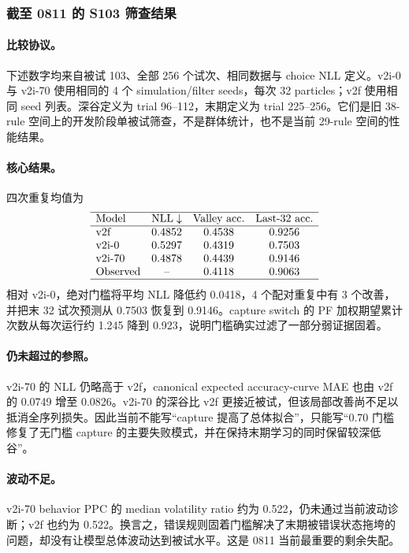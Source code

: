 \subsubsection{截至 0811 的 S103 筛查结果}

\paragraph{比较协议。}
下述数字均来自被试 103、全部 256 个试次、相同数据与 choice NLL 定义。v2i-0 与 v2i-70 使用相同的 4 个 simulation/filter seeds，每次 32 particles；v2f 使用相同 seed 列表。深谷定义为 trial 96--112，末期定义为 trial 225--256。它们是旧 38-rule 空间上的开发阶段单被试筛查，不是群体统计，也不是当前 29-rule 空间的性能结果。

\paragraph{核心结果。}
四次重复均值为
\begin{equation}
\begin{array}{lccc}
\hline
\text{Model}
&\text{NLL}\downarrow
&\text{Valley acc.}
&\text{Last-32 acc.}
\\
\hline
\text{v2f}
&0.4852&0.4538&0.9256
\\
\text{v2i-0}
&0.5297&0.4319&0.7503
\\
\text{v2i-70}
&0.4878&0.4439&0.9146
\\
\text{Observed}
&\text{--}&0.4118&0.9063
\\
\hline
\end{array}
\label{eq:model0811-s103-summary}
\end{equation}
相对 v2i-0，绝对门槛将平均 NLL 降低约 0.0418，4 个配对重复中有 3 个改善，并把末 32 试次预测从 0.7503 恢复到 0.9146。capture switch 的 PF 加权期望累计次数从每次运行约 1.245 降到 0.923，说明门槛确实过滤了一部分弱证据固着。

\paragraph{仍未超过的参照。}
v2i-70 的 NLL 仍略高于 v2f，canonical expected accuracy-curve MAE 也由 v2f 的 0.0749 增至 0.0826。v2i-70 的深谷比 v2f 更接近被试，但该局部改善尚不足以抵消全序列损失。因此当前不能写“capture 提高了总体拟合”，只能写“0.70 门槛修复了无门槛 capture 的主要失败模式，并在保持末期学习的同时保留较深低谷”。

\paragraph{波动不足。}
v2i-70 behavior PPC 的 median volatility ratio 约为 0.522，仍未通过当前波动诊断；v2f 也约为 0.522。换言之，错误规则固着门槛解决了末期被错误状态拖垮的问题，却没有让模型总体波动达到被试水平。这是 0811 当前最重要的剩余失配。


